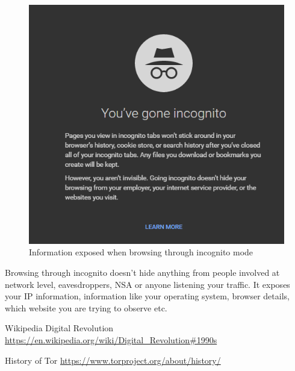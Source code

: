 \documentclass{article}
\begin{document}
      \begin{figure}[h!]
        \includegraphics[width=\linewidth]{incognito_mode.png}
        \caption{Information exposed when browsing through incognito mode}
        \label{fig:incognito_mode}
      \end{figure}

      Browsing through incognito doesn't hide anything from people involved at
      network level, eavesdroppers, NSA or anyone listening your traffic. It
      exposes your IP information, information like your operating system,
      browser details, which website you are trying to observe etc.

\begin{thebibliography}{2}

    Wikipedia Digital Revolution
    \url{https://en.wikipedia.org/wiki/Digital_Revolution#1990s}

    History of Tor
    \url{https://www.torproject.org/about/history/}

\end{thebibliography}
\end{document}
